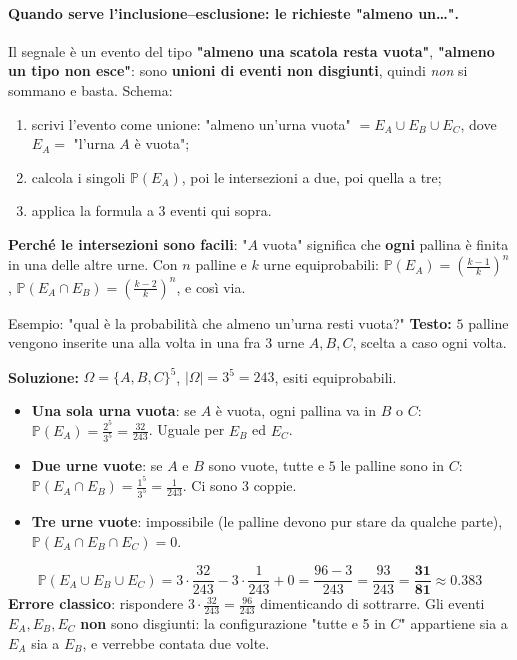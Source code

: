 \documentclass[12pt]{extarticle} %
\begin{document}
\paragraph{Quando serve l'inclusione--esclusione: le richieste "almeno un\dots".} Il segnale è un evento del tipo \textbf{"almeno una scatola resta vuota"}, \textbf{"almeno un tipo non esce"}: sono \textbf{unioni di eventi non disgiunti}, quindi \emph{non} si sommano e basta. Schema:
\begin{enumerate}
    \item scrivi l'evento come unione: "almeno un'urna vuota" $= E_A \cup E_B \cup E_C$, dove $E_A =$ "l'urna $A$ è vuota";
    \item calcola i singoli $\mathbb{P}(E_A)$, poi le intersezioni a due, poi quella a tre;
    \item applica la formula a 3 eventi qui sopra.
\end{enumerate}
{\footnotesize \textbf{Perché le intersezioni sono facili}: "$A$ vuota" significa che \textbf{ogni} pallina è finita in una delle altre urne. Con $n$ palline e $k$ urne equiprobabili: $\mathbb{P}(E_A) = \left(\frac{k-1}{k}\right)^n$, \; $\mathbb{P}(E_A \cap E_B) = \left(\frac{k-2}{k}\right)^n$, e così via.}

\begin{eserciziobox}{{Esempio: "qual è la probabilità che almeno un'urna resti vuota?"}}
\textbf{Testo:} $5$ palline vengono inserite una alla volta in una fra $3$ urne $A,B,C$, scelta a caso ogni volta.
\par\textbf{Soluzione:} $\Omega = \{A,B,C\}^5$, $|\Omega| = 3^5 = 243$, esiti equiprobabili.
\begin{itemize}[-]
    \item \textbf{Una sola urna vuota}: se $A$ è vuota, ogni pallina va in $B$ o $C$: $\mathbb{P}(E_A) = \frac{2^5}{3^5} = \frac{32}{243}$. Uguale per $E_B$ ed $E_C$.
    \item \textbf{Due urne vuote}: se $A$ e $B$ sono vuote, tutte e $5$ le palline sono in $C$: $\mathbb{P}(E_A \cap E_B) = \frac{1^5}{3^5} = \frac{1}{243}$. Ci sono $3$ coppie.
    \item \textbf{Tre urne vuote}: impossibile (le palline devono pur stare da qualche parte), $\mathbb{P}(E_A \cap E_B \cap E_C) = 0$.
\end{itemize}
$$ \mathbb{P}(E_A \cup E_B \cup E_C) = 3\cdot\frac{32}{243} - 3\cdot\frac{1}{243} + 0 = \frac{96-3}{243} = \frac{93}{243} = \mathbf{\frac{31}{81}} \approx 0.383 $$
{\footnotesize \textbf{Errore classico}: rispondere $3 \cdot \frac{32}{243} = \frac{96}{243}$ dimenticando di sottrarre. Gli eventi $E_A, E_B, E_C$ \textbf{non} sono disgiunti: la configurazione "tutte e 5 in $C$" appartiene sia a $E_A$ sia a $E_B$, e verrebbe contata due volte.}
\end{eserciziobox}
\end{document}
